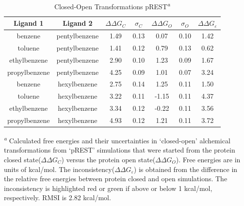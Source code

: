 \begin{table}[!htb]
\centering
\caption{Closed-Open Transformations pREST\textsuperscript{\emph{a}}}
\label{tbl:C-O_pREST}
\begin{tabular}{|c|c|c|c|c|c|c|}
\hline
\textbf{Ligand 1}       & \textbf{Ligand 2}    & \boldmath$\Delta\Delta G_{C}$ & \boldmath$\sigma_{C}$ & \boldmath$\Delta\Delta G_{O}$ & \boldmath$\sigma_{O}$ & \boldmath$\Delta\Delta G_{\varepsilon}$\\ \hline
benzene         & pentylbenzene & 1.49       & 0.13     & 0.07   & 0.10     & \cellcolor[HTML]{FFCCC9}1.42 \\ \hline
toluene         & pentylbenzene & 1.41       & 0.12     & 0.79   & 0.13     & \cellcolor[HTML]{9AFF99}0.62 \\ \hline
ethylbenzene    & pentylbenzene & 2.90       & 0.10     & 1.23   & 0.09     & \cellcolor[HTML]{FFCCC9}1.67 \\ \hline
propylbenzene & pentylbenzene & 4.25       & 0.09     & 1.01   & 0.07     & \cellcolor[HTML]{FFCCC9}3.24 \\ \hline
benzene         & hexylbenzene  & 2.75       & 0.14     & 1.25   & 0.11     & \cellcolor[HTML]{FFCCC9}1.50 \\ \hline
toluene         & hexylbenzene  & 3.22       & 0.11     & -1.15  & 0.11     & \cellcolor[HTML]{FFCCC9}4.37 \\ \hline
ethylbenzene    & hexylbenzene  & 3.34       & 0.12     & -0.22  & 0.11     & \cellcolor[HTML]{FFCCC9}3.56 \\ \hline
propylbenzene & hexylbenzene  & 4.93       & 0.12     & 1.21   & 0.11     & \cellcolor[HTML]{FFCCC9}3.72 \\ \hline
\end{tabular}

\textsuperscript{\emph{a}} Calculated free energies and their uncertainties in `closed-open' alchemical transformations from `pREST' simulations that were started from the protein closed state(\boldmath$\Delta\Delta G_{C}$) versus the protein open state(\boldmath$\Delta\Delta G_{O}$).
Free energies are in units of kcal/mol. 
The inconsistency(\boldmath$\Delta\Delta G_{\varepsilon}$) is obtained from the difference in the relative free energies between protein closed and open simulations. 
The inconsistency is highlighted red or green if above or below 1 kcal/mol, respectively.
RMSI is 2.82 kcal/mol. 
\end{table}

